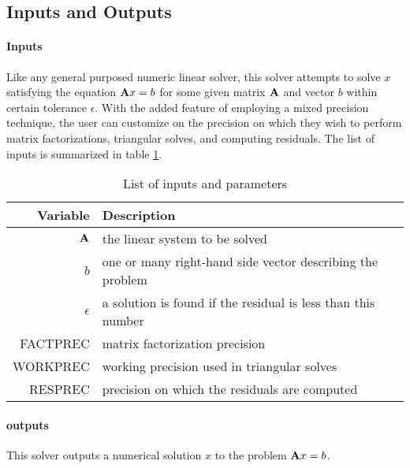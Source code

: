 \documentclass{article}
\begin{document}
\subsection{Inputs and Outputs}


\paragraph{Inputs}

Like any general purposed numeric linear solver, this solver attempts to solve
\(x\) satisfying the equation \(\mathbf{A}x = b\) for some given matrix
\(\mathbf{A}\) and vector \(b\) within certain tolerance \(\epsilon\). With the
added feature of employing a mixed precision technique, the user can customize
on the precision on which they wish to perform matrix factorizations, triangular
solves, and computing residuals. The list of inputs is summarized in table
\ref{tab:inputs}.

\begin{table}[hp]
  \centering
  \caption{List of inputs and parameters}
  \label{tab:inputs}
  \begin{tabularx}{1.0\linewidth}{rX}
    \toprule
    \textbf{Variable}  & \textbf{Description} \\
    \midrule
    \(\mathbf{A}\) & the linear system to be solved \\
    \(b\)        & one or many right-hand side vector describing the problem \\
    \(\epsilon\)        & a solution is found if the residual is less than this number \\
    FACTPREC     & matrix factorization precision \\
    WORKPREC     & working precision used in triangular solves \\
    RESPREC      & precision on which the residuals are computed \\
    \bottomrule
  \end{tabularx}
\end{table}

\paragraph{outputs}

This solver outputs a numerical solution \(x\) to the problem \(\mathbf{A}x = b\).
\end{document}
